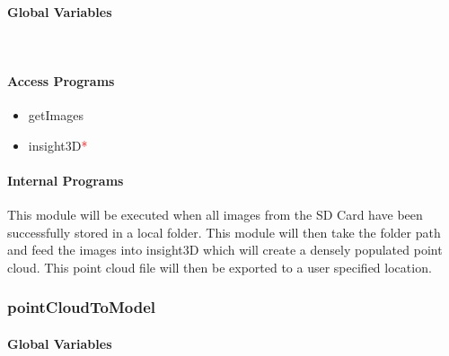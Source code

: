 \documentclass[10pt,letterpaper]{article}
\begin{document}
\paragraph{Global Variables}
~
\begin{table}[H]
  \caption{imagesToPointCloud}
\end{table}

\paragraph{Access Programs}
\begin{itemize}
	\item getImages 
    \item insight3D\textcolor{red}{*}
\end{itemize}

\paragraph{Internal Programs}
This module will be executed when all images from the SD Card have been successfully stored in a local folder. This module will then take the folder path and feed the images into insight3D which will create a densely populated point cloud. This point cloud file will then be exported to a user specified location.

\subsubsection{pointCloudToModel}
\paragraph{Global Variables}
~
\begin{table}[H]
  \caption{pointCloudToModel}
\end{table}
\end{document}
